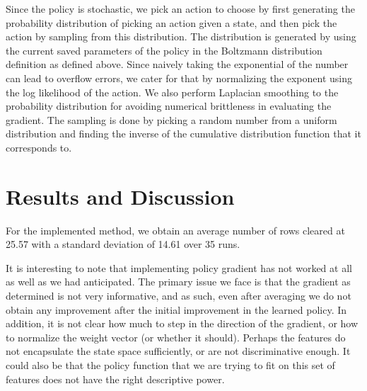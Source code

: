 \documentclass[11pt]{article}
\begin{document}
Since the policy is stochastic, we pick an action to choose by first generating the probability distribution of picking an action given a state, and then pick the action by sampling from this distribution. The distribution is generated by using the current saved parameters of the policy in the Boltzmann distribution definition as defined above. Since naively taking the exponential of the number can lead to overflow errors, we cater for that by normalizing the exponent using the log likelihood of the action. We also perform Laplacian smoothing to the probability distribution for avoiding numerical brittleness in evaluating the gradient. The sampling is done by picking a random number from a uniform distribution and finding the inverse of the cumulative distribution function that it corresponds to.


\section{Results and Discussion}
For the implemented method, we obtain an average number of rows cleared at 25.57 with a standard deviation of 14.61 over 35 runs.

It is interesting to note that implementing policy gradient has not worked at all as well as we had anticipated. The primary issue we face is that the gradient as determined is not very informative, and as such, even after averaging we do not obtain any improvement after the initial improvement in the learned policy. In addition, it is not clear how much to step in the direction of the gradient, or how to normalize the weight vector (or whether it should). Perhaps the features do not encapsulate the state space sufficiently, or are not discriminative enough. It could also be that the policy function that we are trying to fit on this set of features does not have the right descriptive power. 
\end{document}
